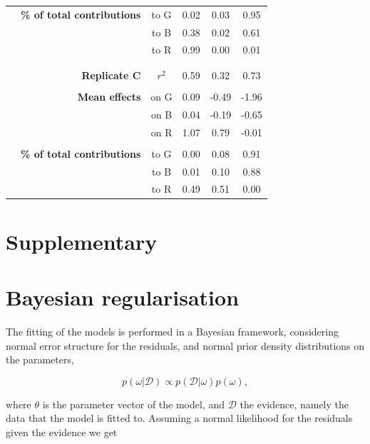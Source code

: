 \documentclass[11pt, oneside]{article}
\newcommand{\beginsupplement}{%
        \setcounter{table}{0}
        \renewcommand{\thetable}{S\arabic{table}}%
        \setcounter{figure}{0}
        \renewcommand{\thefigure}{S\arabic{figure}}%
     }
\begin{document}
\begin{table}[H]
\begin{center}
\begin{tabular}{rrcccc}
	& \textbf{\% of total contributions} 
    &   to G &  0.02 & 0.03 & 0.95 \\ 
    & & to B &  0.38 & 0.02 & 0.61 \\
    & & to R &  0.99 & 0.00 & 0.01 \\
	& \\
	\hline
	& \\
    & \textbf{Replicate C} & $r^2$  &  0.59 & 0.32 & 0.73 \\
	& \\
	& \textbf{Mean effects} 
    &   on G & 0.09 & -0.49 & -1.96 \\
    & & on B & 0.04 & -0.19 & -0.65 \\
    & & on R & 1.07 &  0.79 & -0.01 \\
	& \\
	& \textbf{\% of total contributions} 
    &   to G &  0.00 & 0.08 & 0.91 \\
    & & to B &  0.01 & 0.10 & 0.88 \\
    & & to R &  0.49 & 0.51 & 0.00 \\
\end{tabular}
\end{center}
\end{table}
\newpage

\newpage
\section{Supplementary}
\appendix
\beginsupplement

\section{Bayesian regularisation}

The fitting of the models is performed in a Bayesian framework, considering normal error structure for the residuals, and normal prior density distributions on the parameters,

\vspace{-0.5cm}
\begin{equation}
	p(\omega | \mathcal{D}) \propto  p(\mathcal{D} | \omega) p(\omega),
\end{equation}

where $\theta$ is the parameter vector of the model, and $\mathcal{D}$ the evidence, namely the data that the model is fitted to.
Assuming a normal likelihood for the residuals given the evidence we get
\end{document}
